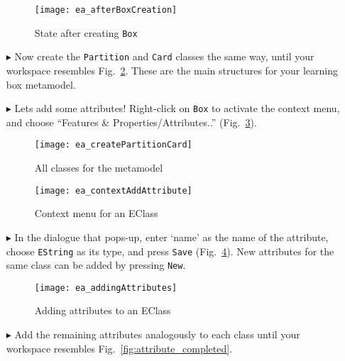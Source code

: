 \begin{itemize}
\begin{figure}[htbp]
	\centering
  \texttt{[image: ea\_afterBoxCreation]}
	\caption{State after creating \texttt{Box}}
	\label{fig:eclass_completed}
\end{figure}

\item[$\blacktriangleright$] Now create the \texttt{Partition} and \texttt{Card} classes the same way, until your workspace resembles
Fig.~\ref{fig:all_eclasses}. These are the main structures for your learning box metamodel.

\vspace{0.5cm}

\item[$\blacktriangleright$] Lets add some attributes! Right-click on \texttt{Box} to activate the context menu, and choose ``Features \&
Properties/Attributes..'' (Fig.~\ref{fig:attribute}).

\begin{figure}[htbp]
	\centering
  \texttt{[image: ea\_createPartitionCard]}
	\caption{All classes for the metamodel}
	\label{fig:all_eclasses}
\end{figure}

\begin{figure}[htbp]
	\centering
  \texttt{[image: ea\_contextAddAttribute]}
	\caption{Context menu for an EClass}
	\label{fig:attribute}
\end{figure}
\FloatBarrier

\item[$\blacktriangleright$] In the dialogue that pops-up, enter `name' as the name of the attribute, choose \texttt{EString} as its type, and press
\texttt{Save} (Fig.~\ref{fig:attribute_properties}). New attributes for the same class can be added by pressing \texttt{New}.

\vspace{1.0cm}

\begin{figure}[htbp]
	\centering
  \texttt{[image: ea\_addingAttributes]}
	\caption{Adding attributes to an EClass}
	\label{fig:attribute_properties}
\end{figure}

\vspace{0.5cm}

\item[$\blacktriangleright$] Add the remaining attributes analogously to each class until your workspace resembles Fig.~\ref{fig:attribute_completed}.


\end{itemize}

